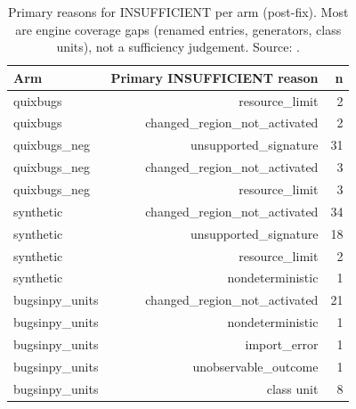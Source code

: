 \begin{table}[t]
\centering\scriptsize
\caption{Primary reasons for INSUFFICIENT per arm (post-fix). Most are engine coverage gaps (renamed entries, generators, class units), not a sufficiency judgement. Source: .}
\label{tab:reasons}
\begin{tabular}{lrr}
\hline
Arm & Primary INSUFFICIENT reason & n \\
\hline
quixbugs & resource\_limit & 2 \\
quixbugs & changed\_region\_not\_activated & 2 \\
quixbugs\_neg & unsupported\_signature & 31 \\
quixbugs\_neg & changed\_region\_not\_activated & 3 \\
quixbugs\_neg & resource\_limit & 3 \\
synthetic & changed\_region\_not\_activated & 34 \\
synthetic & unsupported\_signature & 18 \\
synthetic & resource\_limit & 2 \\
synthetic & nondeterministic & 1 \\
bugsinpy\_units & changed\_region\_not\_activated & 21 \\
bugsinpy\_units & nondeterministic & 1 \\
bugsinpy\_units & import\_error & 1 \\
bugsinpy\_units & unobservable\_outcome & 1 \\
bugsinpy\_units & class unit & 8 \\
\hline
\end{tabular}
\end{table}
